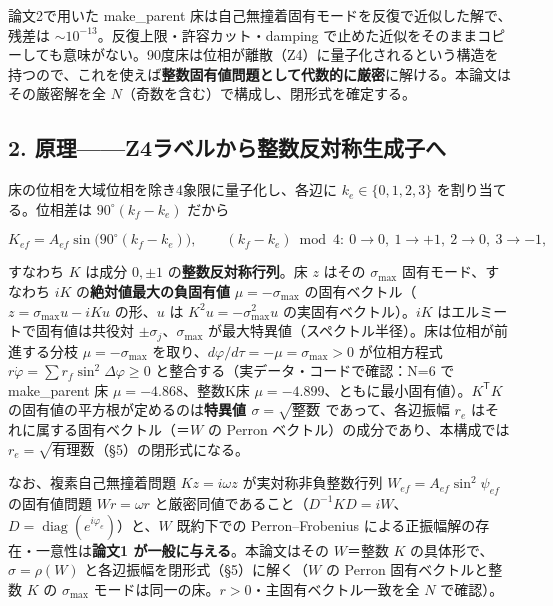 \documentclass[
  a4paper,
]{ltjsarticle}
\begin{document}
論文2で用いた make\_parent
床は自己無撞着固有モードを反復で近似した解で、残差は
\(\sim10^{-13}\)。反復上限・許容カット・damping
で止めた近似をそのままコピーしても意味がない。90度床は位相が離散（Z4）に量子化されるという構造を持つので、これを使えば\textbf{整数固有値問題として代数的に厳密}に解ける。本論文はその厳密解を全
\(N\)（奇数を含む）で構成し、閉形式を確定する。

\subsection{2.
原理------Z4ラベルから整数反対称生成子へ}\label{ux539fux7406z4ux30e9ux30d9ux30ebux304bux3089ux6574ux6570ux53cdux5bfeux79f0ux751fux6210ux5b50ux3078}

床の位相を大域位相を除き4象限に量子化し、各辺に \(k_e\in\{0,1,2,3\}\)
を割り当てる。位相差は \(90^\circ(k_f-k_e)\) だから

\[K_{ef}=A_{ef}\sin\!\big(90^\circ(k_f-k_e)\big),\qquad (k_f-k_e)\bmod4:\ 0\to0,\ 1\to+1,\ 2\to0,\ 3\to-1,\]

すなわち \(K\) は成分 \(0,\pm1\) の\textbf{整数反対称行列}。床 \(z\)
はその \(\sigma_{\max}\) 固有モード、すなわち \(iK\)
の\textbf{絶対値最大の負固有値} \(\mu=-\sigma_{\max}\)
の固有ベクトル（\(z=\sigma_{\max}u-iKu\) の形、\(u\) は
\(K^2u=-\sigma_{\max}^2u\) の実固有ベクトル）。\(iK\)
はエルミートで固有値は共役対 \(\pm\sigma_j\)、\(\sigma_{\max}\)
が最大特異値（スペクトル半径）。床は位相が前進する分枝
\(\mu=-\sigma_{\max}\) を取り、\(d\varphi/d\tau=-\mu=\sigma_{\max}>0\)
が位相方程式 \(r\dot\varphi=\sum r_f\sin^2\Delta\varphi\ge0\)
と整合する（実データ・コードで確認：N=6 で make\_parent 床
\(\mu=-4.868\)、整数K床
\(\mu=-4.899\)、ともに最小固有値）。\(K^{\mathsf T}K\)
の固有値の平方根が定めるのは\textbf{特異値
\(\sigma=\sqrt{\text{整数}}\)} であって、各辺振幅 \(r_e\)
はそれに属する固有ベクトル（＝\(W\) の Perron
ベクトル）の成分であり、本構成では
\(r_e=\sqrt{\text{有理数}}\)（§5）の閉形式になる。

なお、複素自己無撞着問題 \(Kz=i\omega z\) が実対称非負整数行列
\(W_{ef}=A_{ef}\sin^2\psi_{ef}\) の固有値問題 \(Wr=\omega r\)
と厳密同値であること（\(D^{-1}KD=iW\)、\(D=\operatorname{diag}(e^{i\varphi_e})\)）と、\(W\)
既約下での Perron--Frobenius による正振幅解の存在・一意性は\textbf{論文1
が一般に与える}。本論文はその \(W\)＝整数 \(K\)
の具体形で、\(\sigma=\rho(W)\) と各辺振幅を閉形式（§5）に解く（\(W\) の
Perron 固有ベクトルと整数 \(K\) の \(\sigma_{\max}\)
モードは同一の床。\(r>0\)・主固有ベクトル一致を全 \(N\) で確認）。
\end{document}
